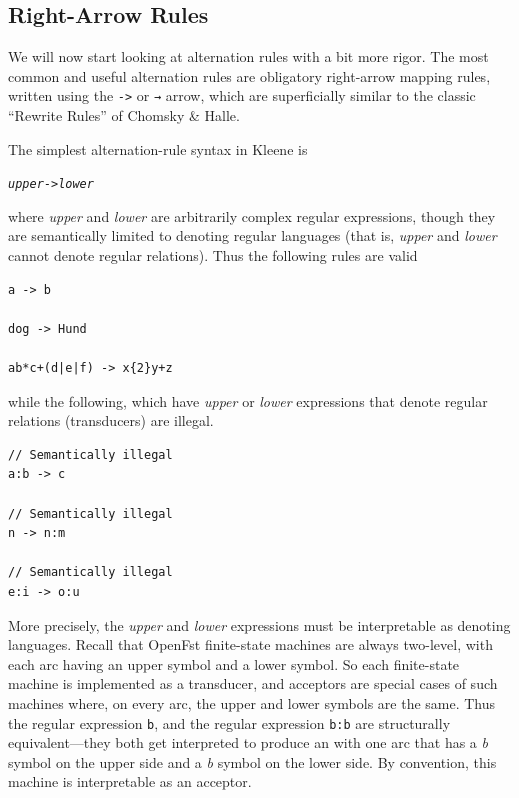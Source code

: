 \subsection{Right-Arrow Rules}

We will now start looking at alternation rules with a bit more rigor.  
The most common and useful alternation rules are obligatory right-arrow mapping rules, written using
the \texttt{->} or \texttt{→} arrow, which are
superficially similar to the classic ``Rewrite Rules'' of Chomsky \& Halle.

The simplest alternation-rule syntax in Kleene is

\begin{alltt}
\emph{upper} -> \emph{lower}
\end{alltt}

\noindent
where \emph{upper} and \emph{lower} are
arbitrarily complex regular expressions, though they are semantically limited to
denoting regular languages (that is, \emph{upper} and \emph{lower} cannot denote regular relations).
Thus the following rules are valid


\begin{Verbatim}
a -> b

dog -> Hund

ab*c+(d|e|f) -> x{2}y+z
\end{Verbatim}

\noindent
while the following, which have \emph{upper} or \emph{lower} expressions that denote regular relations
(transducers) are illegal.

\begin{Verbatim}
// Semantically illegal
a:b -> c

// Semantically illegal
n -> n:m

// Semantically illegal
e:i -> o:u
\end{Verbatim}


More precisely, the \emph{upper} and \emph{lower} expressions must be interpretable as denoting
languages.  Recall that OpenFst finite-state machines are always two-level, with each arc having an
upper symbol and a lower symbol.  So each finite-state machine is implemented as a transducer, and
acceptors are special cases of such machines where, on every arc, the upper and lower symbols are the
same.  Thus the regular expression \texttt{b}, and the regular expression \texttt{b:b} are structurally
equivalent---they both get interpreted to produce an \fsm{} with one arc that has a \emph{b} symbol on
the upper side and a \emph{b} symbol on the lower side.  By convention, this machine is interpretable
as an acceptor.

